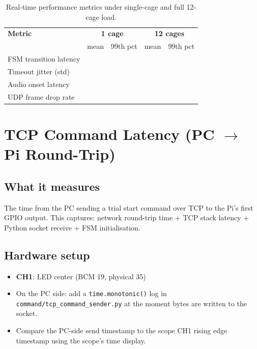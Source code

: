 \documentclass[11pt, a4paper]{article}
\begin{document}
\begin{table}[h!]
\centering
\begin{tabular}{lcccc}
\toprule
\textbf{Metric} & \multicolumn{2}{c}{\textbf{1 cage}} & \multicolumn{2}{c}{\textbf{12 cages}} \\
                & mean & 99th pct & mean & 99th pct \\
\midrule
FSM transition latency     & & & & \\
Timeout jitter (std)       & & & & \\
Audio onset latency        & & & & \\
UDP frame drop rate        & & & & \\
\bottomrule
\end{tabular}
\caption{Real-time performance metrics under single-cage and full 12-cage load.}
\end{table}

\newpage

\section{TCP Command Latency (PC $\rightarrow$ Pi Round-Trip)}

\subsection*{What it measures}

The time from the PC sending a trial start command over TCP to the Pi's first
GPIO output. This captures: network round-trip time + TCP stack latency +
Python socket receive + FSM initialisation.

\subsection*{Hardware setup}

\begin{itemize}[noitemsep]
    \item \textbf{CH1}: LED center (BCM 19, physical 35)
    \item On the PC side: add a \texttt{time.monotonic()} log in
          \texttt{command/tcp\_command\_sender.py} at the moment bytes are
          written to the socket.
    \item Compare the PC-side send timestamp to the scope CH1 rising edge
          timestamp using the scope's time display.
\end{itemize}
\end{document}
